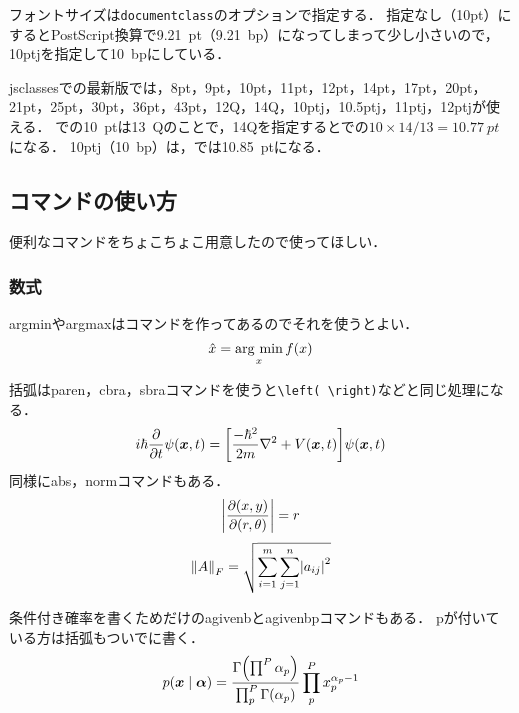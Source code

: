 フォントサイズは\verb|documentclass|のオプションで指定する．
指定なし（10pt）にするとPostScript換算で\SI{9.21}{pt}（\SI{9.21}{bp}）になってしまって少し小さいので，10ptjを指定して\SI{10}{bp}にしている．

jsclassesでの最新版では，8pt，9pt，10pt，11pt，12pt，14pt，17pt，20pt，21pt，25pt，30pt，36pt，43pt，12Q，14Q，10ptj，10.5ptj，11ptj，12ptjが使える．
\pLaTeX{}での\SI{10}{pt}は\SI{13}{Q}のことで，14Qを指定すると\pLaTeX{}での$10 \times 14/13=\SI{10.77}{pt}$になる．
10ptj（\SI{10}{bp}）は，\pLaTeX{}では\SI{10.85}{pt}になる．

\subsection{コマンドの使い方}
\label{ssec:02-hoge-commands}

便利なコマンドをちょこちょこ用意したので使ってほしい．

\subsubsection{数式}

argminやargmaxはコマンドを作ってあるのでそれを使うとよい．
\begin{equation}
    \hat{x} = \operatorname*{arg~min}_{x} f(x)
    \label{eq:eq1}
\end{equation}

括弧はparen，cbra，sbraコマンドを使うと\verb|\left( \right)|などと同じ処理になる．
\begin{equation}
    i\hbar\diffp*{\psi\paren{\bm{x},t}}{t} = \sbra{\frac{-\hbar^2}{2m}\nabla^2 + V\paren{\bm{x},t}}\psi\paren{\bm{x},t}
    \label{eq:eq2}
\end{equation}
同様にabs，normコマンドもある．
\begin{equation}
    \abs{\jacob{x,y}{r,\theta}} = r
    \label{eq:eq3}
\end{equation}
\begin{equation}
    \norm{A}_F = \sqrt{\sum_{i=1}^m\sum_{j=1}^n\abs{a_{ij}}^2}
    \label{eq:eq4}
\end{equation}

条件付き確率を書くためだけのagivenbとagivenbpコマンドもある．
pが付いている方は括弧もついでに書く．
\begin{equation}
    p\agivenbp{\bm{x}}{\bm{\alpha}} = \frac{\Gamma\paren{\prod^P\alpha_p}}{\prod_p^P\Gamma\paren{\alpha_p}}\prod_p^Px_p^{\alpha_p-1}
    \label{eq:eq5}
\end{equation}

